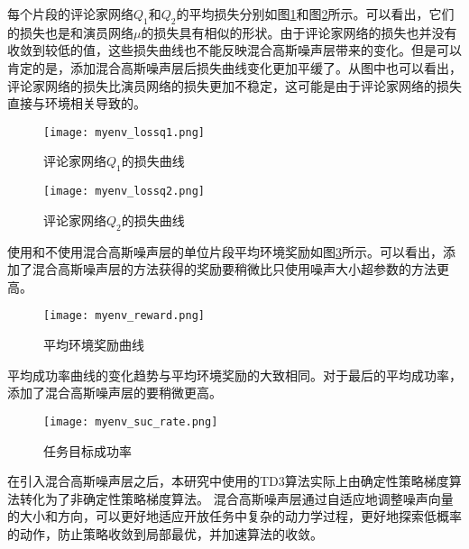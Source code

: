     每个片段的评论家网络$Q_1$和$Q_2$的平均损失分别如图\ref{fcn_lossq1}和图\ref{fcn_lossq2}所示。可以看出，它们的损失也是和演员网络$\mu$的损失具有相似的形状。由于评论家网络的损失也并没有收敛到较低的值，这些损失曲线也不能反映混合高斯噪声层带来的变化。但是可以肯定的是，添加混合高斯噪声层后损失曲线变化更加平缓了。从图中也可以看出，评论家网络的损失比演员网络的损失更加不稳定，这可能是由于评论家网络的损失直接与环境相关导致的。

        \begin{figure}[htpb]
        \centering
        \texttt{[image: myenv\_lossq1.png]}
        \caption{评论家网络$Q_1$的损失曲线}
            \label{fcn_lossq1}
        \end{figure}

        \begin{figure}[htpb]
        \centering
        \texttt{[image: myenv\_lossq2.png]}
        \caption{评论家网络$Q_2$的损失曲线}
            \label{fcn_lossq2}
        \end{figure}

        使用和不使用混合高斯噪声层的单位片段平均环境奖励如图\ref{fcn_reward}所示。可以看出，添加了混合高斯噪声层的方法获得的奖励要稍微比只使用噪声大小超参数的方法更高。

        \begin{figure}[htpb]
        \centering
        \texttt{[image: myenv\_reward.png]}
        \caption{平均环境奖励曲线}
            \label{fcn_reward}
        \end{figure}

        平均成功率曲线的变化趋势与平均环境奖励的大致相同。对于最后的平均成功率，添加了混合高斯噪声层的要稍微更高。

        \begin{figure}[htpb]
        \centering
        \texttt{[image: myenv\_suc\_rate.png]}
        \caption{任务目标成功率}
            \label{fcn_suc_rate}
        \end{figure}

        在引入混合高斯噪声层之后，本研究中使用的TD3算法实际上由确定性策略梯度算法转化为了非确定性策略梯度算法。
        混合高斯噪声层通过自适应地调整噪声向量的大小和方向，可以更好地适应开放任务中复杂的动力学过程，更好地探索低概率的动作，防止策略收敛到局部最优，并加速算法的收敛。


